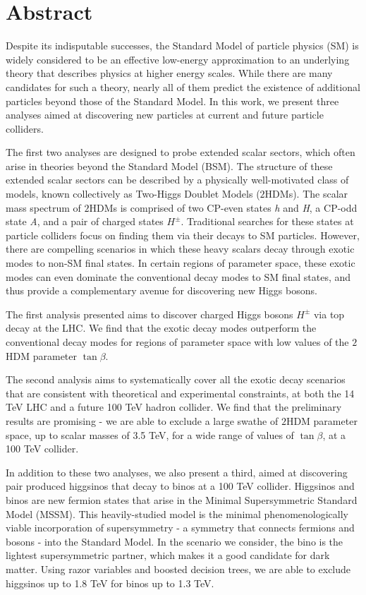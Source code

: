 \chapter*{Abstract}
{}

Despite its indisputable successes, the Standard Model of particle physics (SM) is widely considered to be an effective low-energy approximation to an underlying theory that describes physics at higher energy scales. While there are many candidates for such a theory, nearly all of them predict the existence of additional particles beyond those of the Standard Model. In this work, we present three analyses aimed at discovering new particles at current and future particle colliders.

The first two analyses are designed to probe extended scalar sectors, which often arise in theories beyond the Standard Model (BSM). The structure of these extended scalar sectors can be described by a physically well-motivated class of models, known collectively as Two-Higgs Doublet Models ($2$HDMs). The scalar mass spectrum of $2$HDMs is comprised of two CP-even states \emph{h} and \emph{H}, a CP-odd state \emph{A}, and a pair of charged states $H^\pm$. Traditional searches for these states at particle colliders focus on finding them via their decays to SM particles. However, there are compelling scenarios in which these heavy scalars decay through exotic modes to non-SM final states. In certain regions of parameter space, these exotic modes can even dominate the conventional decay modes to SM final states, and thus provide a complementary avenue for discovering new Higgs bosons. 

The first analysis presented aims to discover charged Higgs bosons $H^\pm$ via top decay at the LHC. We find that the exotic decay modes outperform the conventional decay modes for regions of parameter space with low values of the $2$HDM parameter $\tan\beta$. 

The second analysis aims to systematically cover all the exotic decay scenarios that are consistent with theoretical and experimental constraints, at both the 14 TeV LHC and a future 100 TeV hadron collider. We find that the preliminary results are promising - we are able to exclude  a large swathe of $2$HDM parameter space, up to scalar masses of 3.5 TeV, for a wide range of values of $\tan\beta$, at a 100 TeV collider.

In addition to these two analyses, we also present a third, aimed at discovering pair produced higgsinos that decay to binos at a 100 TeV collider. Higgsinos and binos are new fermion states that arise in the Minimal Supersymmetric Standard Model (MSSM). This heavily-studied model is the minimal phenomenologically viable incorporation of supersymmetry - a symmetry that connects fermions and bosons - into the Standard Model. In the scenario we consider, the bino is the lightest supersymmetric partner, which makes it a good candidate for dark matter. Using razor variables and boosted decision trees, we are able to exclude higgsinos up to 1.8 TeV for binos up to 1.3 TeV.


